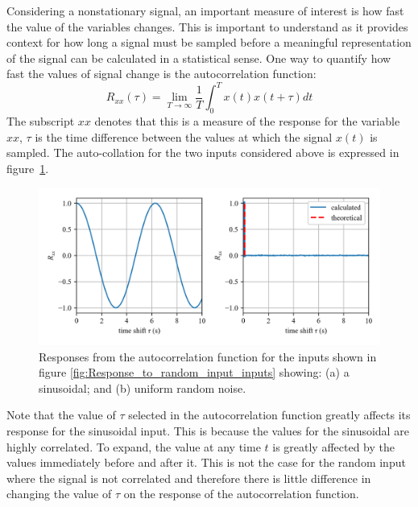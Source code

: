 \documentclass[12pt,letter]{article}
\begin{document}
Considering a nonstationary signal, an important measure of interest is how fast the value of the variables changes. This is important to understand as it provides context for how long a signal must be sampled before a meaningful representation of the signal can be calculated in a statistical sense. One way to quantify how fast the values of signal change is the autocorrelation function: 
\begin{equation}
R_{xx}(\tau) = \lim\limits_{T \rightarrow \infty} \frac{1}{T} \int_{0}^{T}x(t)x(t+\tau)dt
\end{equation}
The subscript $xx$ denotes that this is a measure of the response for the variable $xx$, $\tau$ is the time difference between the values at which the signal $x(t)$ is sampled. The auto-collation for the two inputs considered above is expressed in figure~\ref{fig:Response_to_random_input_autocorrelation}.
\begin{figure}[H]
	\centering
	\includegraphics[width=1\textwidth]{../figures/Response_to_random_input_autocorrelation.png}
	\caption{Responses from the autocorrelation function for the inputs shown in figure \ref{fig:Response_to_random_input_inputs} showing: (a) a sinusoidal; and (b) uniform random noise.}
	\label{fig:Response_to_random_input_autocorrelation}
\end{figure} 
\noindent Note that the value of $\tau$ selected in the autocorrelation function greatly affects its response for the sinusoidal input. This is because the values for the sinusoidal are highly correlated. To expand, the value at any time $t$ is greatly affected by the values immediately before and after it. This is not the case for the random input where the signal is not correlated and therefore there is little difference in changing the value of $\tau$ on the response of the autocorrelation function.  
\end{document}
